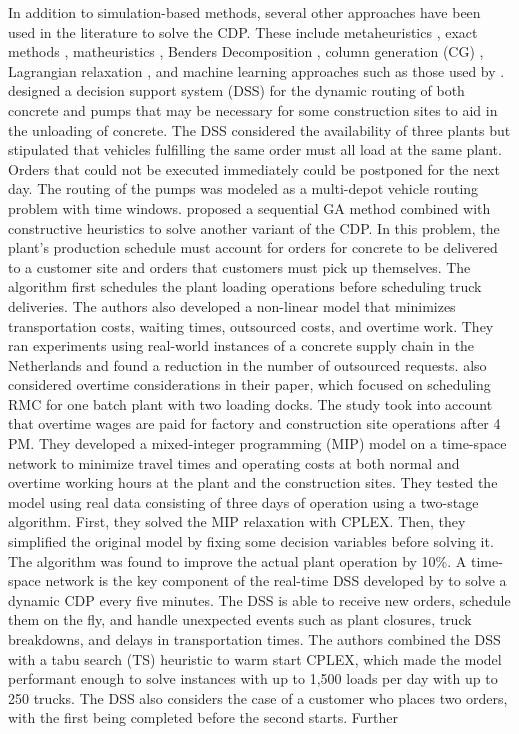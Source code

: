 \documentclass{article}
\begin{document}
In addition to simulation-based methods, several other approaches have been used in the literature to solve the CDP. These include metaheuristics \citep{faria2006distributed, misir2011selection, maghrebi2016sequential, yang2022concrete}, exact methods \citep{yan2007optimal, asbach2009analysis, kinable2014concrete}, matheuristics \citep{schmid2009hybrid, schmid2010hybridization}, Benders Decomposition \citep{maghrebi2014benders}, column generation (CG) \citep{maghrebi2014solving, maghrebi2016column}, Lagrangian relaxation \citep{narayanan2015using}, and machine learning approaches such as those used by \cite{graham2006modeling, maghrebi2014exploring, maghrebi2016matching}. \cite{matsatsinis2004towards} designed a decision support system (DSS) for the dynamic routing of both concrete and pumps that may be necessary for some construction sites to aid in the unloading of concrete. The DSS considered the availability of three plants but stipulated that vehicles fulfilling the same order must all load at the same plant. Orders that could not be executed immediately could be postponed for the next day. The routing of the pumps was modeled as a multi-depot vehicle routing problem with time windows. \cite{naso2007genetic} proposed a sequential GA method combined with constructive heuristics to solve another variant of the CDP. In this problem, the plant's production schedule must account for orders for concrete to be delivered to a customer site and orders that customers must pick up themselves. The algorithm first schedules the plant loading operations before scheduling truck deliveries. The authors also developed a non-linear model that minimizes transportation costs, waiting times, outsourced costs, and overtime work. They ran experiments using real-world instances of a concrete supply chain in the Netherlands and found a reduction in the number of outsourced requests. \cite{yan2007optimal} also considered overtime considerations in their paper, which focused on scheduling RMC for one batch plant with two loading docks. The study took into account that overtime wages are paid for factory and construction site operations after 4 PM. They developed a mixed-integer programming (MIP) model on a time-space network to minimize travel times and operating costs at both normal and overtime working hours at the plant and the construction sites. They tested the model using real data consisting of three days of operation using a two-stage algorithm. First, they solved the MIP relaxation with CPLEX. Then, they simplified the original model by fixing some decision variables before solving it. The algorithm was found to improve the actual plant operation by 10\%. A time-space network is the key component of the real-time DSS developed by \cite{durbin2008or} to solve a dynamic CDP every five minutes. The DSS is able to receive new orders, schedule them on the fly, and handle unexpected events such as plant closures, truck breakdowns, and delays in transportation times. The authors combined the DSS with a tabu search (TS) heuristic to warm start CPLEX, which made the model performant enough to solve instances with up to 1,500 loads per day with up to 250 trucks. The DSS also considers the case of a customer who places two orders, with the first being completed before the second starts. Further 
\end{document}
